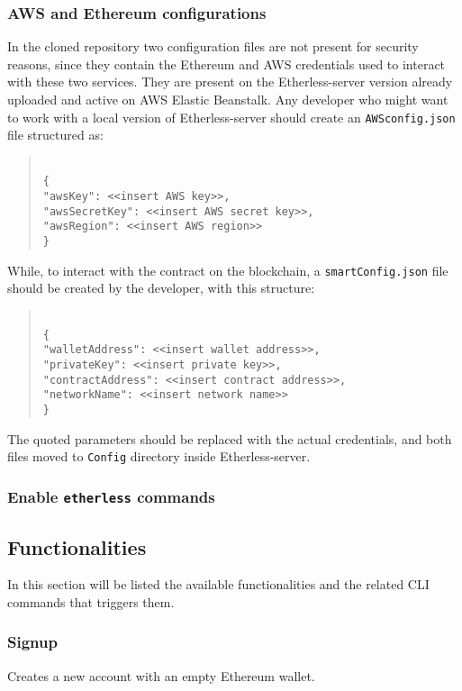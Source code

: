 \subsubsection{AWS and Ethereum configurations}
In the cloned repository two configuration files are not present for security reasons, since they contain the Ethereum and AWS credentials used to interact with these two services. They are present on the Etherless-server version already uploaded and active on AWS Elastic Beanstalk.
Any developer who might want to work with a local version of Etherless-server should create an \texttt{AWSconfig.json} file structured as: 
\begin{quote}
\texttt{ \\
	\{\\
		"awsKey": <<insert AWS key>>, \\
		"awsSecretKey": <<insert AWS secret key>>, \\
		"awsRegion": <<insert AWS region>> \\
	\}\\
}
\end{quote}
While, to interact with the contract on the blockchain, a \texttt{smartConfig.json} file should be created by the developer, with this structure:
\begin{quote}
\texttt{ \\
	\{\\
	"walletAddress": <<insert wallet address>>, \\
	"privateKey": <<insert private key>>, \\
	"contractAddress": <<insert contract address>>, \\
	"networkName": <<insert network name>> \\
	\}\\
}
\end{quote}
The quoted parameters should be replaced with the actual credentials, and both files moved to \texttt{Config} directory inside Etherless-server.
\subsubsection{Enable \texttt{etherless} commands}
\subsection{Functionalities}
In this section will be listed the available functionalities and the related CLI commands that triggers them.
\subsubsection{Signup}
Creates a new account with an empty Ethereum wallet.
